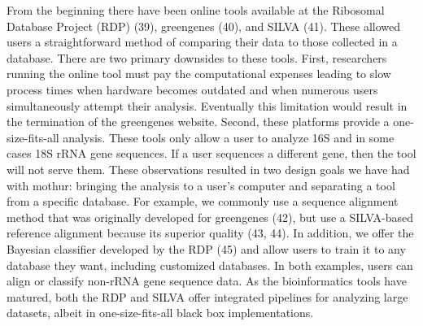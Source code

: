 \documentclass[11pt,]{article}
\begin{document}
From the beginning there have been online tools available at the
Ribosomal Database Project (RDP) (39), greengenes (40), and SILVA (41).
These allowed users a straightforward method of comparing their data to
those collected in a database. There are two primary downsides to these
tools. First, researchers running the online tool must pay the
computational expenses leading to slow process times when hardware
becomes outdated and when numerous users simultaneously attempt their
analysis. Eventually this limitation would result in the termination of
the greengenes website. Second, these platforms provide a
one-size-fits-all analysis. These tools only allow a user to analyze 16S
and in some cases 18S rRNA gene sequences. If a user sequences a
different gene, then the tool will not serve them. These observations
resulted in two design goals we have had with mothur: bringing the
analysis to a user's computer and separating a tool from a specific
database. For example, we commonly use a sequence alignment method that
was originally developed for greengenes (42), but use a SILVA-based
reference alignment because its superior quality (43, 44). In addition,
we offer the  Bayesian classifier developed by the RDP
(45) and allow users to train it to any database they want, including
customized databases. In both examples, users can align or classify
non-rRNA gene sequence data. As the bioinformatics tools have matured,
both the RDP and SILVA offer integrated pipelines for analyzing large
datasets, albeit in one-size-fits-all black box implementations.
\end{document}
